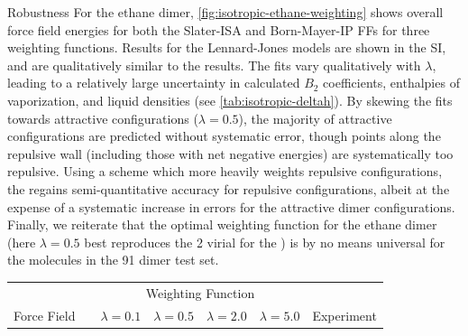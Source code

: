 \begin{subsection}{Robustness}
For the ethane dimer, \cref{fig:isotropic-ethane-weighting} shows overall
force field energies for both the Slater-ISA and Born-Mayer-IP FFs for three
weighting functions. Results for the Lennard-Jones models are shown in the SI,
and are qualitatively similar to the \saptff results.
The \saptff fits vary qualitatively with $\lambda$, leading to a relatively large
uncertainty in calculated $B_2$ coefficients, enthalpies of vaporization, and
liquid densities (see \cref{tab:isotropic-deltah}). 
By skewing the fits towards attractive
configurations ($\lambda = 0.5$), the majority of attractive configurations
are predicted without systematic error, though points along the repulsive wall
(including those with net negative energies) are systematically too repulsive. 
Using a scheme which more heavily weights repulsive configurations, the \saptff
regains semi-quantitative accuracy for repulsive configurations, albeit at the expense
of a systematic increase in errors for the attractive dimer configurations.
Finally, we reiterate that the optimal weighting function for the
ethane dimer (here $\lambda = 0.5$ best reproduces the 2 virial for
the \saptff) is
by no means universal for the molecules in the 91 dimer test set.

\begin{table}
\small
\centering
\renewcommand\arraystretch{1.1}
\begin{tabular}{@{}rcccccc@{}}
\hline
\toprule
& \phantom{} &
  \multicolumn{4}{c}{Weighting Function} \\
\cmidrule{3-6} 

Force Field && $\lambda = 0.1$ &  $\lambda = 0.5$ &  $\lambda = 2.0$ &
$\lambda = 5.0$ & Experiment\\


\end{tabular}
\end{table}
\end{subsection}
